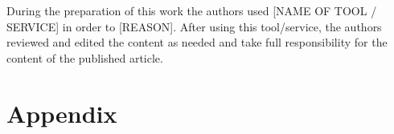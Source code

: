 \documentclass[a4paper, 12pt, fleqn]{article}
\theoremstyle{definition}
\begin{document}
During the preparation of this work the authors used [NAME OF TOOL / SERVICE] in order to [REASON]. After using this tool/service, the authors reviewed and edited the content as needed and take full responsibility for the content of the published article.

%
%


\newpage
\thispagestyle{plain}
\addtolength{\topmargin}{-.5cm}
\addtolength{\textheight}{.8cm}

\renewcommand{\thefigure}{\Alph{section}.\arabic{figure}}%
\setcounter{section}{1}
\setcounter{figure}{0}

\section*{Appendix}
\end{document}
